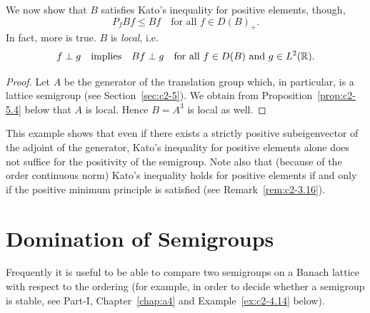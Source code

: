 We now show that $B$ satisfies Kato's inequality for positive elements, though, \ie
\begin{equation}\label{eq:c2-3.20}
P_{f} Bf \leq Bf \quad \text{for all } f \in D(B)_{+}.
\end{equation}
In fact, more is true. $B$ is \emph{local}, i.e.
\begin{equation}\label{eq:c2-3.21}
f \perp g \quad \text{implies} \quad Bf \perp g \quad \text{for all } f \in D(B) \text{ and } g \in L^{2}(\mathbb{R}).
\end{equation}
\begin{proof}
Let $A$ be the generator of the translation group which, in particular, is a lattice semigroup (see Section~\ref{sec:c2-5}). 
We obtain from Proposition~\ref{prop:c2-5.4} below that $A$ is local. 
Hence $B = A^{3}$ is local as well.
\end{proof}
This example shows that even if there exists a strictly positive subeigenvector of the adjoint of the generator, Kato's inequality for positive elements alone does not suffice for the positivity of the semigroup. 
Note also that (because of the order continuous norm) Kato's inequality holds for positive elements if and only if the positive minimum principle is satisfied (see Remark~\ref{rem:c2-3.16}).
\section{Domination of Semigroups} \label{sec:c2-4}
Frequently it is useful to be able to compare two semigroups on a
Banach lattice with respect to the ordering (for example, in order to
decide whether a semigroup is stable, see Part-I, Chapter~\ref{chap:a4} and 
Example~\ref{ex:c2-4.14} below).

